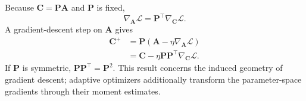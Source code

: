 Because $\mathbf{C}=\mathbf{P}\mathbf{A}$ and $\mathbf{P}$ is fixed,
\begin{equation}
    \nabla_{\mathbf{A}}\mathcal{L}
    =\mathbf{P}^\top\nabla_{\mathbf{C}}\mathcal{L}.
\end{equation}
A gradient-descent step on $\mathbf{A}$ gives
\begin{align}
    \mathbf{C}^{+}
    &=\mathbf{P}\left(\mathbf{A}-\eta\nabla_{\mathbf{A}}\mathcal{L}\right)\\
    &=\mathbf{C}-\eta\mathbf{P}\mathbf{P}^\top
      \nabla_{\mathbf{C}}\mathcal{L}.
\end{align}
If $\mathbf{P}$ is symmetric, $\mathbf{P}\mathbf{P}^\top=\mathbf{P}^2$. This result concerns the induced geometry of gradient descent; adaptive optimizers additionally transform the parameter-space gradients through their moment estimates.
